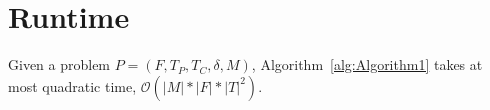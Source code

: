 \section{Runtime}



\begin{theorem}\label{thm:Runtime}
	Given a problem $P = (F, T_P, T_C, \delta, M)$, Algorithm~\ref{alg:Algorithm1} takes at most quadratic time, $\mathcal{O}( |M| * |F| * |T|^2)$. 
\end{theorem}
